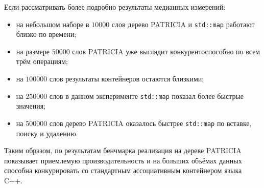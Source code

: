 Если рассматривать более подробно результаты медианных измерений:
\begin{itemize}
    \item на небольшом наборе в \(10000\) слов дерево PATRICIA и \texttt{std::map} работают близко по времени;
    \item на размере \(50000\) слов PATRICIA уже выглядит конкурентоспособно по всем трём операциям;
    \item на \(100000\) слов результаты контейнеров остаются близкими;
    \item на \(250000\) слов в данном эксперименте \texttt{std::map} показал более быстрые значения;
    \item на \(500000\) слов дерево PATRICIA оказалось быстрее \texttt{std::map} по вставке, поиску и удалению.
\end{itemize}

Таким образом, по результатам бенчмарка реализация на дереве PATRICIA показывает приемлемую производительность и на больших объёмах данных способна конкурировать со стандартным ассоциативным контейнером языка C++.

\pagebreak
